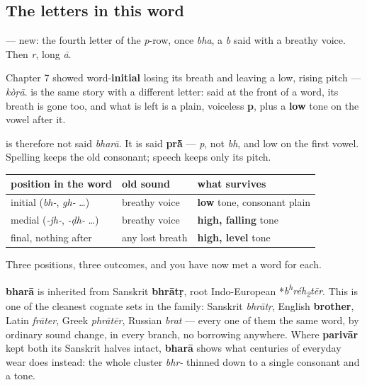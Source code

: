 \subsection*{The letters in this word}
\textbf{} — new: the fourth letter of the \emph{p}-row, once \emph{bha}, a \emph{b} said with a breathy voice. Then \textbf{} \emph{r}, \textbf{} long \emph{ā}.

\begin{sounds}
Chapter 7 showed word-\textbf{initial} \textbf{} losing its breath and leaving a low, rising pitch — \emph{kòṛā}. \textbf{} is the same story with a different letter: said at the front of a word, its breath is gone too, and what is left is a plain, voiceless \textbf{p}, plus a \textbf{low} tone on the vowel after it.

\textbf{} is therefore not said \emph{bharā}. It is said \textbf{prā̀} — \emph{p}, not \emph{bh}, and low on the first vowel. Spelling keeps the old consonant; speech keeps only its pitch.

\noindent
\begin{tabularx}{\linewidth}{@{}>{\raggedright\arraybackslash}X>{\raggedright\arraybackslash}X>{\raggedright\arraybackslash}X@{}}
\toprule
\textbf{position in the word} & \textbf{old sound} & \textbf{what survives} \\
\midrule
initial (\emph{bh-}, \emph{gh-} …) & breathy voice & \textbf{low} tone, consonant plain \\
medial (\emph{-jh-}, \emph{-ḍh-} …) & breathy voice & \textbf{high, falling} tone \\
final, nothing after & any lost breath & \textbf{high, level} tone \\
\bottomrule
\end{tabularx}

Three positions, three outcomes, and you have now met a word for each.
\end{sounds}

\begin{cousinweb}
\textbf{bharā} is inherited from Sanskrit \textbf{bhrātṛ}, root Indo-European *\emph{b\textsuperscript{h}réh\textsubscript{2}tēr}. This is one of the cleanest cognate sets in the family: Sanskrit \emph{bhrātṛ}, English \textbf{brother}, Latin \emph{frāter}, Greek \emph{phrātēr}, Russian \emph{brat} — every one of them the same word, by ordinary sound change, in every branch, no borrowing anywhere. Where \textbf{parivār} kept both its Sanskrit halves intact, \textbf{bharā} shows what centuries of everyday wear does instead: the whole cluster \emph{bhr-} thinned down to a single consonant and a tone.
\end{cousinweb}

